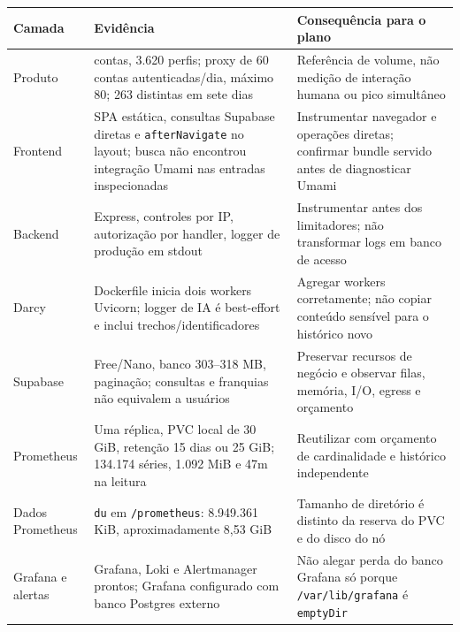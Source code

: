 \documentclass[10pt,a4paper]{article}
\begin{document}
{\def\LTcaptype{none} %
\small
{}
\begin{longtable}[]{@{}
  >{\raggedright\arraybackslash}p{}
  >{\raggedright\arraybackslash}p{}
  >{\raggedright\arraybackslash}p{}@{}}
\toprule\noalign{}
\rowcolor{NFAccent}
\begin{minipage}[b]{\linewidth}\raggedright
Camada
\end{minipage} & \begin{minipage}[b]{\linewidth}\raggedright
Evidência
\end{minipage} & \begin{minipage}[b]{\linewidth}\raggedright
Consequência para o plano
\end{minipage} \\
\midrule\noalign{}
\endhead
\bottomrule\noalign{}
\endlastfoot
Produto & 3.671 contas, 3.620 perfis; proxy de 60 contas
autenticadas/dia, máximo 80; 263 distintas em sete dias & Referência de
volume, não medição de interação humana ou pico simultâneo \\
Frontend & SPA estática, consultas Supabase diretas e
{\footnotesize\ttfamily\nolinkurl{afterNavigate}} no layout; busca não encontrou integração Umami
nas entradas inspecionadas & Instrumentar navegador e operações diretas;
confirmar bundle servido antes de diagnosticar Umami \\
Backend & Express, controles por IP, autorização por handler, logger de
produção em stdout & Instrumentar antes dos limitadores; não transformar
logs em banco de acesso \\
Darcy & Dockerfile inicia dois workers Uvicorn; logger de IA é
best-effort e inclui trechos/identificadores & Agregar workers
corretamente; não copiar conteúdo sensível para o histórico novo \\
Supabase & Free/Nano, banco 303--318 MB, paginação; consultas e
franquias não equivalem a usuários & Preservar recursos de negócio e
observar filas, memória, I/O, egress e orçamento \\
Prometheus & Uma réplica, PVC local de 30 GiB, retenção 15 dias ou 25
GiB; 134.174 séries, 1.092 MiB e 47m na leitura & Reutilizar com
orçamento de cardinalidade e histórico independente \\
Dados Prometheus & {\footnotesize\ttfamily\nolinkurl{du}} em {\footnotesize\ttfamily\nolinkurl{/prometheus}}: 8.949.361 KiB,
aproximadamente 8,53 GiB & Tamanho de diretório é distinto da reserva do
PVC e do disco do nó \\
Grafana e alertas & Grafana, Loki e Alertmanager prontos; Grafana
configurado com banco Postgres externo & Não alegar perda do banco
Grafana só porque {\footnotesize\ttfamily\nolinkurl{/var/lib/grafana}} é {\footnotesize\ttfamily\nolinkurl{emptyDir}} \\
\end{longtable}
}
\end{document}
